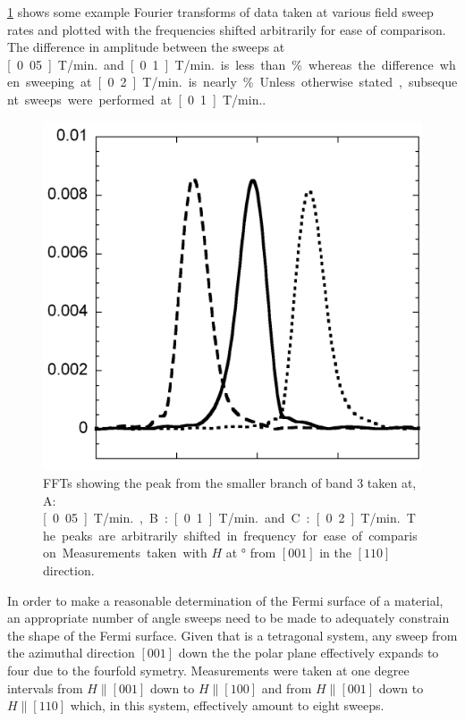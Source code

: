  \Fig\ref{Fig:3:ComparisonSweepRates} shows some example Fourier transforms of data taken at various field sweep rates and plotted with the frequencies shifted arbitrarily for ease of comparison. The difference in amplitude between the sweeps at \unit[0.05]{T/min.} and \unit[0.1]{T/min.} is less than \unit[1]{\%} whereas the difference when sweeping at \unit[0.2]{T/min.} is nearly \unit[5]{\%}. Unless otherwise stated, subsequent sweeps were performed at \unit[0.1]{T/min.}.
\begin{figure}[h!]
    \begin{center}
        \includegraphics[scale=0.7]{Chapter3-dHvABaFe2P2/Figures/AngleDepMeasurements/SweepRateComparison/SweepRateComparison}
        \caption{FFTs showing the peak from the smaller branch of band $3$ taken at, A: \unit[0.05]{T/min.}, B: \unit[0.1]{T/min.} and C: \unit[0.2]{T/min.}. The peaks are arbitrarily shifted in frequency for ease of comparison. Measurements taken with $H$ at \unit[10]{\degree} from $[001]$ in the $[110]$ direction.}
        \label{Fig:3:ComparisonSweepRates}
    \end{center}
\end{figure}

In order to make a reasonable determination of the Fermi surface of a material, an appropriate number of angle sweeps need to be made to adequately constrain the shape of the Fermi surface. Given that \BaFeP is a tetragonal system, any sweep from the azimuthal direction $[001]$ down the the polar plane effectively expands to four due to the fourfold symetry. Measurements were taken at one degree intervals from $H\parallel[001]$ down to $H\parallel[100]$ and from $H\parallel[001]$ down to $H\parallel[110]$ which, in this system, effectively amount to eight sweeps.

